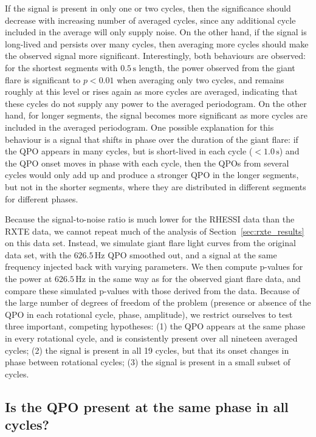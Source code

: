 \documentclass{emulateapj}
\begin{document}
If the signal is present in only one or two cycles, then the significance should decrease with increasing number of averaged cycles, since any additional cycle included in the average will only supply noise. On the other hand, if the signal is long-lived and persists over many cycles, then averaging more cycles should make the observed signal more significant. Interestingly, both behaviours are observed: for the shortest segments with $0.5\, \mathrm{s}$ length, the power observed from the giant flare is significant to $p < 0.01$ when averaging only two cycles, and remains roughly at this level or rises again as more cycles are averaged, indicating that these cycles do not supply any power to the averaged periodogram. On the other hand, for longer segments, the signal becomes more significant as more cycles are included in the averaged periodogram. One possible explanation for this behaviour is a signal that shifts in phase over the duration of the giant flare: if the QPO appears in many cycles, but is short-lived in each cycle ($<1.0 \, \mathrm{s}$) and the QPO onset moves in phase with each cycle, then the QPOs from several cycles would only add up and produce a stronger QPO in the longer segments, but not in the shorter segments, where they are distributed in different segments for different phases. 


Because the signal-to-noise ratio is much lower for the RHESSI data than the RXTE data, we cannot repeat much of the analysis of Section \ref{sec:rxte_results} on this data set. Instead, we simulate giant flare light curves from the original data set, with the $626.5 \, \mathrm{Hz}$ QPO smoothed out, and a signal at the same frequency injected back with varying parameters. We then compute p-values for the power at $626.5 \, \mathrm{Hz}$ in the same way as for the observed giant flare data, and compare these simulated p-values with those derived from the data. Because of the large number of degrees of freedom of the problem (presence or absence of the QPO in each rotational cycle, phase, amplitude), we restrict ourselves to test three important, competing hypotheses: (1) the QPO appears at the same phase in every rotational cycle, and is consistently present over all nineteen averaged cycles; (2) the signal is present in all 19 cycles, but that its onset changes in phase between rotational cycles; (3) the signal is present in a small subset of cycles. 

\subsection{Is the QPO present at the same phase in all cycles?}
\end{document}

